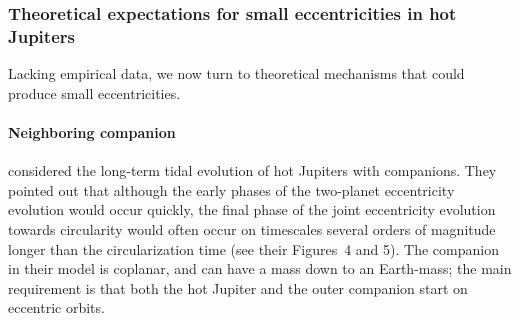 \documentclass[12pt,twocolumn,tighten]{aastex62}
\begin{document}
\subsubsection{Theoretical expectations for small eccentricities in hot
Jupiters}

Lacking empirical data, we now turn to theoretical mechanisms that could
produce small eccentricities.

\paragraph{Neighboring companion}
\citet{mardling_long-term_2007} considered the long-term tidal evolution
of hot Jupiters with companions.  They pointed out that although the
early phases of the two-planet eccentricity evolution would occur
quickly, the final phase of the joint eccentricity evolution towards
circularity would often occur on timescales several orders of magnitude
longer than the circularization time (see their Figures~4 and 5).  The
companion in their model is coplanar, and can have a mass down to an
Earth-mass; the main requirement is that both the hot Jupiter and the
outer companion start on eccentric orbits.
\end{document}

